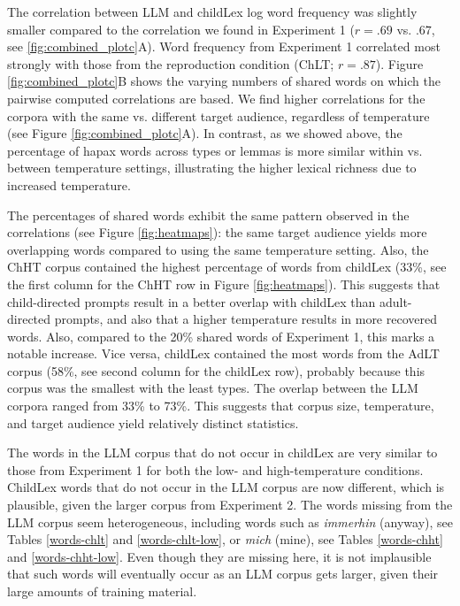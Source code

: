 \documentclass[manuscript]{stjour}
\begin{document}
The correlation between LLM and childLex log word frequency was slightly smaller compared to the correlation we found in Experiment 1 ($r=.69$ vs. $.67$, see \ref{fig:combined_plotc}A). Word frequency from Experiment 1 correlated most strongly with those from the reproduction condition (ChLT; $r=.87$). Figure \ref{fig:combined_plotc}B shows the varying numbers of shared words on which the pairwise computed correlations are based. We find higher correlations for the corpora with the same vs. different target audience, regardless of temperature (see Figure \ref{fig:combined_plotc}A). In contrast, as we showed above, the percentage of hapax words across types or lemmas is more similar within vs. between temperature settings, illustrating the higher lexical richness due to increased temperature. 

The percentages of shared words exhibit the same pattern observed in the correlations (see Figure \ref{fig:heatmaps}): the same target audience yields more overlapping words compared to using the same temperature setting. Also, the ChHT corpus contained the highest percentage of words from childLex (33\%, see the first column for the ChHT row in Figure \ref{fig:heatmaps}). This suggests that child-directed prompts result in a better overlap with childLex than adult-directed prompts, and also that a higher temperature results in more recovered words. Also, compared to the 20\% shared words of Experiment 1, this marks a notable increase. Vice versa, childLex contained the most words from the AdLT corpus (58\%, see second column for the childLex row), probably because this corpus was the smallest with the least types. The overlap between the LLM corpora ranged from 33\% to 73\%. This suggests that corpus size, temperature, and target audience yield relatively distinct statistics.  

The words in the LLM corpus that do not occur in childLex are very similar to those from Experiment 1 for both the low- and high-temperature conditions. ChildLex words that do not occur in the LLM corpus are now different, which is plausible, given the larger corpus from Experiment 2. The words missing from the LLM corpus seem heterogeneous, including words such as \textit{immerhin} (anyway), see Tables \ref{words-chlt} and \ref{words-chlt-low}, or \textit{mich} (mine), see Tables \ref{words-chht} and \ref{words-chht-low}. Even though they are missing here, it is not implausible that such words will eventually occur as an LLM corpus gets larger, given their large amounts of training material. 
\end{document}
